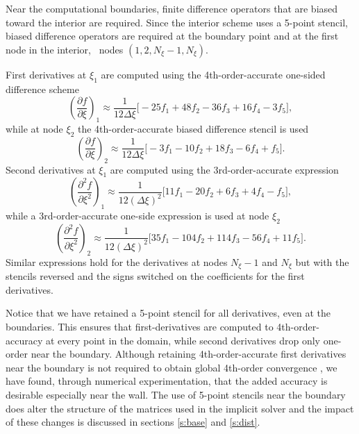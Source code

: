 Near the computational boundaries, finite difference operators that are biased
toward the interior are required.  Since the interior scheme uses a 5-point
stencil, biased difference operators are required at the boundary point and at
the first node in the interior, \ie\ nodes $(1,2,N_\xi-1,N_\xi)$.

First derivatives at $\xi_1$ are computed using the 4th-order-accurate
one-sided difference scheme
%
\begin{equation}
 \left( \frac{\partial f}{\partial \xi} \right)_1 \approx 
 \frac{1}{12\Delta\xi} \Big[ -25 f_{1} + 48 f_{2} - 
                              36 f_{3} + 16 f_{4} -
                               3 f_{5} \Big] ,
\end{equation}
%
while at node $\xi_2$ the 4th-order-accurate biased difference stencil is used
%
\begin{equation}
 \left( \frac{\partial f}{\partial \xi} \right)_2 \approx 
 \frac{1}{12\Delta\xi} \Big[ -3 f_{1} - 10 f_{2} + 
                             18 f_{3} -  6 f_{4} + f_{5} \Big] .
\end{equation}
%
Second derivatives at $\xi_1$ are computed using the 3rd-order-accurate
expression
%
\begin{equation}
 \left( \frac{\partial^2 f}{\partial \xi^2} \right)_1 \approx 
 \frac{1}{12(\Delta\xi)^2} \Big[ 11 f_{1} - 20 f_{2} + 
                                  6 f_{3} +  4 f_{4} - f_{5} \Big] ,
\end{equation}
%
while a 3rd-order-accurate one-side expression is used at node $\xi_2$
%
\begin{equation}
 \left( \frac{\partial^2 f}{\partial \xi^2} \right)_2 \approx 
 \frac{1}{12(\Delta\xi)^2} \Big[  35 f_{1} - 104 f_{2} +
                                 114 f_{3} -  56 f_{4} + 11 f_{5} \Big] .
\end{equation}
%
Similar expressions hold for the derivatives at nodes $N_\xi-1$ and $N_\xi$
but with the stencils reversed and the signs switched on the coefficients for
the first derivatives.

Notice that we have retained a 5-point stencil for all derivatives, even at
the boundaries.  This ensures that first-derivatives are computed to
4th-order-accuracy at every point in the domain, while second derivatives drop
only one-order near the boundary.  Although retaining 4th-order-accurate first
derivatives near the boundary is not required to obtain global 4th-order
convergence \cite{Gustafsson:75}, we have found, through numerical
experimentation, that the added accuracy is desirable especially near the
wall.  The use of 5-point stencils near the boundary does alter the structure
of the matrices used in the implicit solver and the impact of these changes is
discussed in sections \ref{s:base} and \ref{s:dist}.

